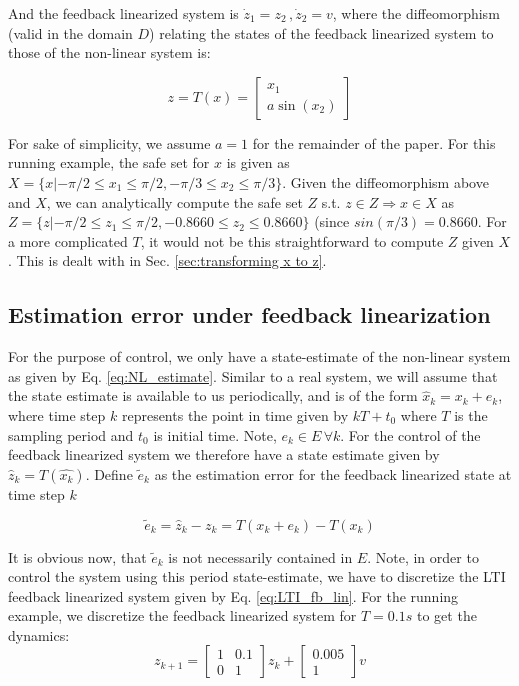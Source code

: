 And the feedback linearized system is $\dot{z}_1 = z_2\, ,\dot{z}_2 = v$, where the diffeomorphism (valid in the domain $D$) relating the states of the feedback linearized system to those of the non-linear system is:

\begin{equation}
z = T(x) = \begin{bmatrix} x_1 \\ a\sin(x_2) \end{bmatrix}
\end{equation}

For sake of simplicity, we assume $a=1$ for the remainder of the paper. For this running example, the safe set for $x$ is given as $X = \lbrace x| -\pi /2 \leq x_1 \leq \pi /2,-\pi /3 \leq x_2 \leq \pi/3 \rbrace$. Given the diffeomorphism above and $X$, we can analytically compute the safe set $Z$ s.t. $z \in Z \Rightarrow x \in X$ as $Z = \lbrace z| -\pi /2 \leq z_1 \leq \pi /2, -0.8660  \leq z_2 \leq 0.8660\rbrace$ (since $sin(\pi/3) = 0.8660$. For a more complicated $T$, it would not be this straightforward to compute $Z$ given $X$. This is dealt with in Sec. \ref{sec:transforming x to z}.

\subsection{Estimation error under feedback linearization}
\label{sec:EstErrFbLin}
For the purpose of control, we only have a state-estimate of the non-linear system as given by Eq. \ref{eq:NL_estimate}. Similar to a real system, we will assume that the state estimate is available to us periodically, and is of the form $\hat{x}_k = x_k + e_k$, where time step $k$ represents the point in time given by $kT+t_0$ where $T$ is the sampling period and $t_0$ is initial time. Note, $e_k \in E \, \forall k$. For the control of the feedback linearized system we therefore have a state estimate given by $\hat{z}_k = T(\hat{x_k})$. Define $\tilde{e}_k$ as the estimation error for the feedback linearized state at time step $k$

\begin{equation}
\label{eq:NLesterr}
\tilde{e}_k =\hat{z}_k - z_k =  T(x_k + e_k) - T(x_k)
\end{equation}

It is obvious now, that $\tilde{e}_k$ is not necessarily contained in  $E$. Note, in order to control the system using this period state-estimate, we have to discretize the LTI feedback linearized system given by Eq. \ref{eq:LTI_fb_lin}. For the running example, we discretize the feedback linearized system for $T=0.1s$ to get the dynamics:
\begin{equation}
\label{toy_dt}
z_{k+1} = \begin{bmatrix} 1 & 0.1 \\ 0 & 1 \end{bmatrix} z_k + \begin{bmatrix} 0.005 \\ 1 \end{bmatrix}v
\end{equation}

